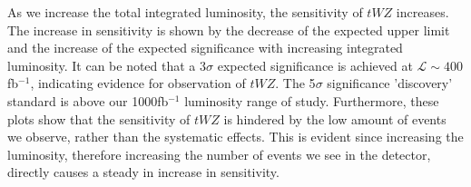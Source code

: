 As we increase the total integrated luminosity, the sensitivity of $tWZ$ increases. The increase in sensitivity is shown by the decrease of the expected upper limit and the increase of the expected significance with increasing integrated luminosity. It can be noted that a 3$\sigma$ expected significance is achieved at $\mathcal{L} \sim 400$fb$^{-1}$, indicating evidence for observation of $tWZ$. The 5$\sigma$ significance 'discovery' standard is above our 1000fb$^{-1}$ luminosity range of study. Furthermore, these plots show that the sensitivity of $tWZ$ is hindered by the low amount of events we observe, rather than the systematic effects. This is evident since increasing the luminosity, therefore increasing the number of events we see in the detector, directly causes a steady in increase in sensitivity.

